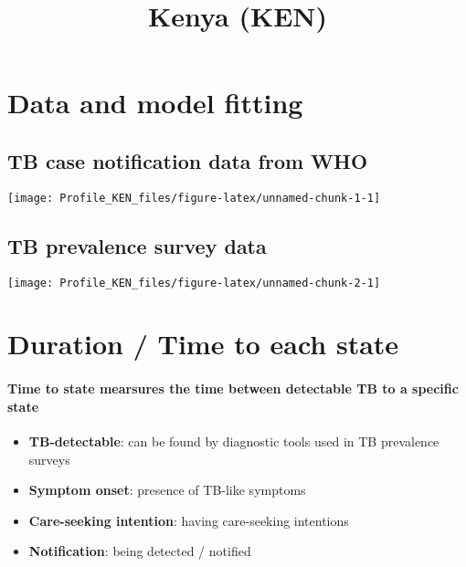 \documentclass[
]{article}
\title{Kenya (KEN)}
\author{}
\date{\vspace{-2.5em}}
\providecommand{\tightlist}{%
  \setlength{\itemsep}{0pt}\setlength{\parskip}{0pt}}
\begin{document}
\maketitle

{
\setcounter{tocdepth}{2}
\tableofcontents
}
\hypertarget{data-and-model-fitting}{%
\section{Data and model fitting}\label{data-and-model-fitting}}

\hypertarget{tb-case-notification-data-from-who}{%
\subsection{TB case notification data from
WHO}\label{tb-case-notification-data-from-who}}

\texttt{[image: Profile\_KEN\_files/figure-latex/unnamed-chunk-1-1]}

\hypertarget{tb-prevalence-survey-data}{%
\subsection{TB prevalence survey data}\label{tb-prevalence-survey-data}}

\texttt{[image: Profile\_KEN\_files/figure-latex/unnamed-chunk-2-1]}

\newpage

\hypertarget{duration-time-to-each-state}{%
\section{Duration / Time to each
state}\label{duration-time-to-each-state}}

\hypertarget{time-to-state-mearsures-the-time-between-detectable-tb-to-a-specific-state}{%
\paragraph{Time to state mearsures the time between detectable TB to a
specific
state}\label{time-to-state-mearsures-the-time-between-detectable-tb-to-a-specific-state}}

\begin{itemize}
\tightlist
\item
  \textbf{TB-detectable}: can be found by diagnostic tools used in TB
  prevalence surveys
\item
  \textbf{Symptom onset}: presence of TB-like symptoms
\item
  \textbf{Care-seeking intention}: having care-seeking intentions
\item
  \textbf{Notification}: being detected / notified
\end{itemize}
\end{document}
